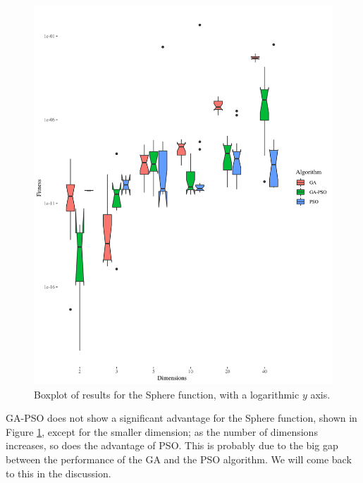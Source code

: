 \documentclass[runningheads]{llncs}
\begin{document}
\begin{figure}[h!tb]
  \centering
  \includegraphics[height=0.4\textheight]{img/sphere-boxplot.png}
  \caption{Boxplot of results for the Sphere function, with a logarithmic $y$ axis.\label{fig:boxplot:sphere}}
\end{figure}
%
GA-PSO does not show a significant advantage for the Sphere
function, shown in Figure \ref{fig:boxplot:sphere}, except for the
smaller dimension; as the number of dimensions increases, so does the
advantage of PSO. This is probably due to the big gap between the
performance of the GA and the PSO algorithm. We will come back to this
in the discussion.
\end{document}

